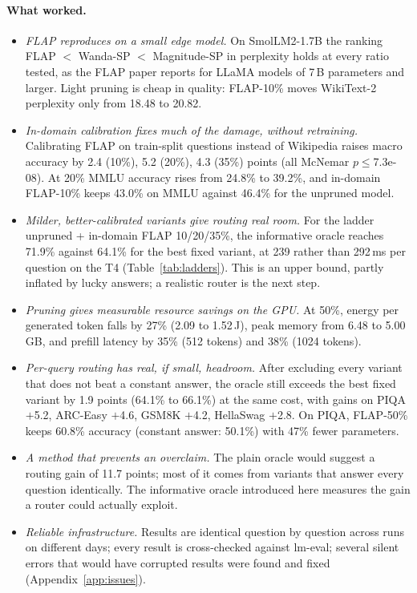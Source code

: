 \paragraph{What worked.}
\begin{itemize}
\item \emph{FLAP reproduces on a small edge model.} On SmolLM2-1.7B the ranking FLAP $<$ Wanda-SP $<$ Magnitude-SP in perplexity holds at every ratio tested, as the FLAP paper reports for LLaMA models of 7\,B parameters and larger. Light pruning is cheap in quality: FLAP-10\% moves WikiText-2 perplexity only from 18.48 to 20.82.
\item \emph{In-domain calibration fixes much of the damage, without retraining.} Calibrating FLAP on train-split questions instead of Wikipedia raises macro accuracy by 2.4 (10\%), 5.2 (20\%), 4.3 (35\%) points (all McNemar $p\le$7.3e-08). At 20\% MMLU accuracy rises from 24.8\% to 39.2\%, and in-domain FLAP-10\% keeps 43.0\% on MMLU against 46.4\% for the unpruned model.
\item \emph{Milder, better-calibrated variants give routing real room.} For the ladder unpruned + in-domain FLAP 10/20/35\%, the informative oracle reaches 71.9\% against 64.1\% for the best fixed variant, at 239 rather than 292\,ms per question on the T4 (Table~\ref{tab:ladders}). This is an upper bound, partly inflated by lucky answers; a realistic router is the next step.
\item \emph{Pruning gives measurable resource savings on the GPU.} At 50\%, energy per generated token falls by 27\% (2.09 to 1.52\,J), peak memory from 6.48 to 5.00\,GB, and prefill latency by 35\% (512 tokens) and 38\% (1024 tokens).
\item \emph{Per-query routing has real, if small, headroom.} After excluding every variant that does not beat a constant answer, the oracle still exceeds the best fixed variant by 1.9 points (64.1\% to 66.1\%) at the same cost, with gains on PIQA $+$5.2, ARC-Easy $+$4.6, GSM8K $+$4.2, HellaSwag $+$2.8. On PIQA, FLAP-50\% keeps 60.8\% accuracy (constant answer: 50.1\%) with 47\% fewer parameters.
\item \emph{A method that prevents an overclaim.} The plain oracle would suggest a routing gain of 11.7 points; most of it comes from variants that answer every question identically. The informative oracle introduced here measures the gain a router could actually exploit.
\item \emph{Reliable infrastructure.} Results are identical question by question across runs on different days; every result is cross-checked against lm-eval; several silent errors that would have corrupted results were found and fixed (Appendix~\ref{app:issues}).
\end{itemize}
